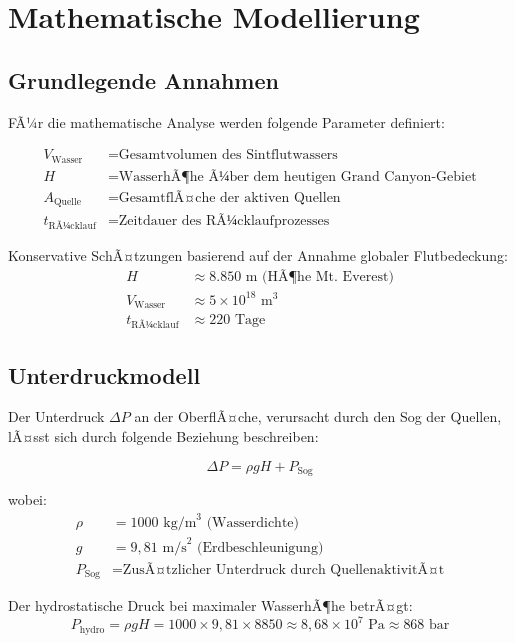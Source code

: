 ﻿\documentclass[12pt,a4paper]{report}
\begin{document}
\chapter{Mathematische Modellierung}

\section{Grundlegende Annahmen}

FÃ¼r die mathematische Analyse werden folgende Parameter definiert:

\begin{align}
	V_{\text{Wasser}} &= \text{Gesamtvolumen des Sintflutwassers} \\
	H &= \text{WasserhÃ¶he Ã¼ber dem heutigen Grand Canyon-Gebiet} \\
	A_{\text{Quelle}} &= \text{GesamtflÃ¤che der aktiven Quellen} \\
	t_{\text{RÃ¼cklauf}} &= \text{Zeitdauer des RÃ¼cklaufprozesses}
\end{align}

Konservative SchÃ¤tzungen basierend auf der Annahme globaler Flutbedeckung:
\begin{align}
	H &\approx 8.850 \text{ m (HÃ¶he Mt. Everest)} \\
	V_{\text{Wasser}} &\approx 5 \times 10^{18} \text{ m}^3 \\
	t_{\text{RÃ¼cklauf}} &\approx 220 \text{ Tage}
\end{align}

\section{Unterdruckmodell}

Der Unterdruck $\Delta P$ an der OberflÃ¤che, verursacht durch den Sog der Quellen, lÃ¤sst sich durch folgende Beziehung beschreiben:

\begin{equation}
	\Delta P = \rho g H + P_{\text{Sog}}
\end{equation}

wobei:
\begin{align}
	\rho &= 1000 \text{ kg/m}^3 \text{ (Wasserdichte)} \\
	g &= 9{,}81 \text{ m/s}^2 \text{ (Erdbeschleunigung)} \\
	P_{\text{Sog}} &= \text{ZusÃ¤tzlicher Unterdruck durch QuellenaktivitÃ¤t}
\end{align}

Der hydrostatische Druck bei maximaler WasserhÃ¶he betrÃ¤gt:
\begin{equation}
	P_{\text{hydro}} = \rho g H = 1000 \times 9{,}81 \times 8850 \approx 8{,}68 \times 10^7 \text{ Pa} \approx 868 \text{ bar}
\end{equation}
\end{document}
